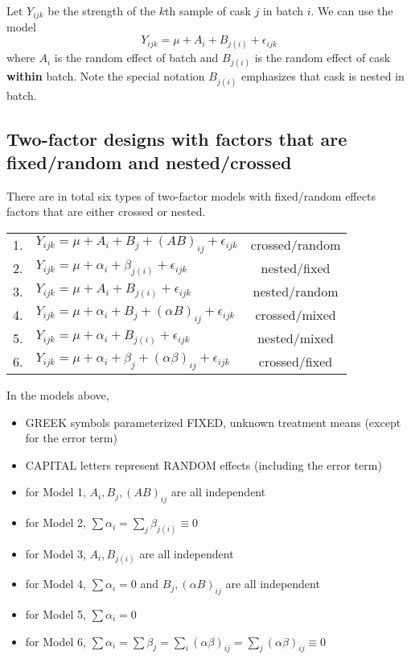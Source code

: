 Let $Y_{ijk}$ be the strength of the $k$th sample of cask $j$ in batch $i$.
We can use the model
$$
Y_{ijk} = \mu + A_i + B_{j(i)} + \epsilon_{ijk}
$$
where $A_i$ is the random effect of batch and $B_{j(i)}$ is the random effect of cask {\bf within} batch.
Note the special notation $B_{j(i)}$ emphasizes that cask is nested in batch.

\subsection*{Two-factor designs with factors that are fixed/random and nested/crossed}

There are in total six types of two-factor models with fixed/random effects factors that are either crossed or nested.

\begin{table}[H]
	\renewcommand{\arraystretch}{1.5}
	\centering
	\begin{tabular}{cl|c}
	1. & $Y_{ijk} = \mu + A_i + B_j + (AB)_{ij} + \epsilon_{ijk}$ & crossed/random\\
	2. & $Y_{ijk} = \mu + \alpha_i + \beta_{j(i)} + \epsilon_{ijk}$ & nested/fixed\\
	3. & $Y_{ijk} = \mu + A_i + B_{j(i)} + \epsilon_{ijk}$ & nested/random\\
	4. & $Y_{ijk} = \mu + \alpha_i + B_{j} + (\alpha B)_{ij} + \epsilon_{ijk}$ & crossed/mixed\\
	5. & $Y_{ijk} = \mu + \alpha_i + B_{j(i)}  + \epsilon_{ijk}$ & nested/mixed\\
	6. & $Y_{ijk} = \mu + \alpha_i + \beta_j + (\alpha \beta)_{ij}  + \epsilon_{ijk}$ & crossed/fixed\\
	\end{tabular}
\end{table}

In the models above,
\begin{itemize}
	\item GREEK symbols parameterized FIXED, unknown treatment means (except for the error term)
	\item CAPITAL letters represent RANDOM effects (including the error term)
	\item for Model 1, $A_i, B_j, (AB)_{ij}$ are all independent	
	\item for Model 2, $\sum \alpha_i = \sum_j \beta_{j(i)} \equiv 0$
	\item for Model 3, $A_i ,B_{j(i)}$ are all independent
	\item for Model 4, $\sum \alpha_i = 0$ and $B_j, (\alpha B)_{ij}$ are all independent
	\item for Model 5, $\sum \alpha_i = 0$
	\item for Model 6, $\sum \alpha_i = \sum \beta_j = \sum_i(\alpha \beta)_{ij} = \sum_j (\alpha \beta)_{ij} \equiv 0$
\end{itemize}

